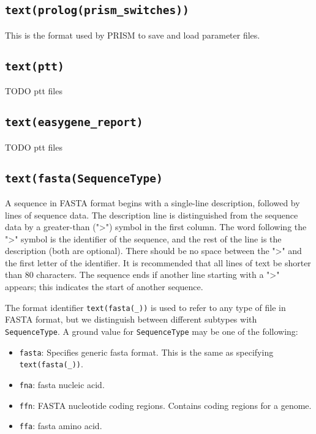 \documentclass{book}
\begin{document}
\subsection{\texttt{text(prolog(prism\_switches))}}

This is the format used by PRISM to save and load parameter files.

\subsection{\texttt{text(ptt)}}

TODO ptt files

\subsection{\texttt{text(easygene\_report)}}

TODO ptt files

\subsection{\texttt{text(fasta(SequenceType)}}

A sequence in FASTA format begins with a single-line description,
followed by lines of sequence data. The description line is
distinguished from the sequence data by a greater-than (">") symbol in
the first column. The word following the ">" symbol is the identifier
of the sequence, and the rest of the line is the description (both are
optional). There should be no space between the ">" and the first
letter of the identifier. It is recommended that all lines of text be
shorter than 80 characters. The sequence ends if another line starting
with a ">" appears; this indicates the start of another sequence. 

The format identifier \texttt{text(fasta(\_))} is used to refer to any
type of file in FASTA format, but we distinguish between different 
subtypes with \texttt{SequenceType}. A ground value for
\texttt{SequenceType} may be one of the following:

\begin{itemize}
\item \texttt{fasta}: Specifies generic fasta format. This is the same
  as specifying \texttt{text(fasta(\_))}.
\item \texttt{fna}: fasta nucleic acid. 
\item \texttt{ffn}: FASTA nucleotide coding regions. Contains coding
  regions for a genome.
\item \texttt{ffa}: fasta amino acid.
\end{itemize}
\end{document}
